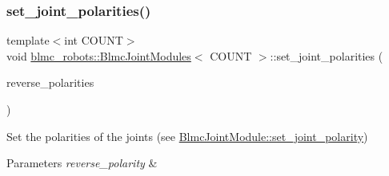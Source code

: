\subsubsection{\texorpdfstring{set\+\_\+joint\+\_\+polarities()}{set\_joint\_polarities()}}
{\footnotesize\ttfamily template$<$int C\+O\+U\+NT$>$ \\
void \hyperlink{classblmc__robots_1_1BlmcJointModules}{blmc\+\_\+robots\+::\+Blmc\+Joint\+Modules}$<$ C\+O\+U\+NT $>$\+::set\+\_\+joint\+\_\+polarities (\begin{DoxyParamCaption}\item[{std\+::array$<$ bool, C\+O\+U\+NT $>$}]{reverse\+\_\+polarities }\end{DoxyParamCaption})\hspace{0.3cm}{\ttfamily [inline]}}



Set the polarities of the joints (see \hyperlink{classblmc__robots_1_1BlmcJointModule_a137da65771a8628db4692e3bfc924f07}{Blmc\+Joint\+Module\+::set\+\_\+joint\+\_\+polarity}) 


\begin{DoxyParams}{Parameters}
{\em reverse\+\_\+polarity} & \\
\hline
\end{DoxyParams}
\mbox{\label{classblmc__robots_1_1BlmcJointModules_a905addfe3271be5bc88bd785c5cbb032}} 
